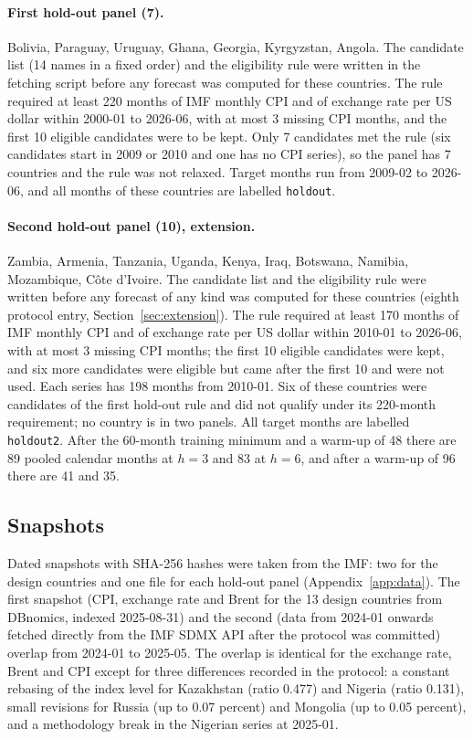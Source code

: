 \paragraph{First hold-out panel (7).} Bolivia, Paraguay, Uruguay, Ghana, Georgia, Kyrgyzstan, Angola. The candidate list (14 names in a fixed order) and the eligibility rule were written in the fetching script before any forecast was computed for these countries. The rule required at least 220 months of IMF monthly CPI and of exchange rate per US dollar within 2000-01 to 2026-06, with at most 3 missing CPI months, and the first 10 eligible candidates were to be kept. Only 7 candidates met the rule (six candidates start in 2009 or 2010 and one has no CPI series), so the panel has 7 countries and the rule was not relaxed. Target months run from 2009-02 to 2026-06, and all months of these countries are labelled \texttt{holdout}.

\paragraph{Second hold-out panel (10), extension.} Zambia, Armenia, Tanzania, Uganda, Kenya, Iraq, Botswana, Namibia, Mozambique, C\^ote d'Ivoire. The candidate list and the eligibility rule were written before any forecast of any kind was computed for these countries (eighth protocol entry, Section~\ref{sec:extension}). The rule required at least 170 months of IMF monthly CPI and of exchange rate per US dollar within 2010-01 to 2026-06, with at most 3 missing CPI months; the first 10 eligible candidates were kept, and six more candidates were eligible but came after the first 10 and were not used. Each series has 198 months from 2010-01. Six of these countries were candidates of the first hold-out rule and did not qualify under its 220-month requirement; no country is in two panels. All target months are labelled \texttt{holdout2}. After the 60-month training minimum and a warm-up of 48 there are 89 pooled calendar months at $h=3$ and 83 at $h=6$, and after a warm-up of 96 there are 41 and 35.

\subsection{Snapshots}\label{sec:snapshots}

Dated snapshots with SHA-256 hashes were taken from the IMF: two for the design countries and one file for each hold-out panel (Appendix~\ref{app:data}). The first snapshot (CPI, exchange rate and Brent for the 13 design countries from DBnomics, indexed 2025-08-31) and the second (data from 2024-01 onwards fetched directly from the IMF SDMX API after the protocol was committed) overlap from 2024-01 to 2025-05. The overlap is identical for the exchange rate, Brent and CPI except for three differences recorded in the protocol: a constant rebasing of the index level for Kazakhstan (ratio 0.477) and Nigeria (ratio 0.131), small revisions for Russia (up to 0.07 percent) and Mongolia (up to 0.05 percent), and a methodology break in the Nigerian series at 2025-01.

